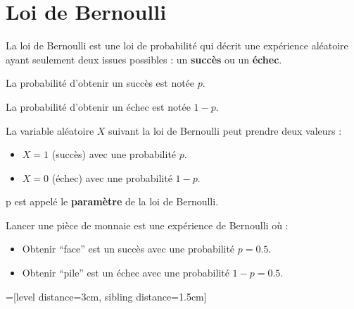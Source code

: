 \documentclass[11pt]{article}
\begin{document}
\section{Loi de Bernoulli}

\begin{definition}
  La loi de Bernoulli est une loi de probabilité qui décrit une
  expérience aléatoire ayant seulement deux issues possibles : un
  \textbf{succès} ou un \textbf{échec}.
\end{definition}

\begin{propriete}
  \begin{enu}
  \item La probabilité d'obtenir un succès est notée $p$.
  \item La probabilité d'obtenir un échec est notée $1 - p$.
  \item La variable aléatoire $X$ suivant la loi de Bernoulli peut
    prendre deux valeurs :
    \begin{itemize}
    \item $X = 1$ (succès) avec une probabilité $p$.
    \item $X = 0$ (échec) avec une probabilité $1 - p$.
    \end{itemize}
  \end{enu}
\end{propriete}

\begin{vocabulaire}
p est appelé le \textbf{paramètre} de la loi de Bernoulli.
\end{vocabulaire}

\begin{exemple}
  Lancer une pièce de monnaie est une expérience de Bernoulli où :
  \begin{itemize}
  \item Obtenir ``face'' est un succès avec une probabilité $p = 0.5$.
  \item Obtenir ``pile'' est un échec avec une probabilité
    $1 - p = 0.5$.
  \end{itemize}
\end{exemple}

\begin{center}
=[level distance=3cm, sibling distance=1.5cm]
\end{center}
\end{document}
